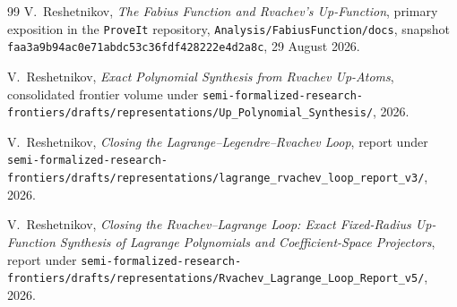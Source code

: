 \documentclass[11pt,oneside]{article}
\numberwithin{equation}{section}
\theoremstyle{definition}
\theoremstyle{remark}
\newcommand{\repo}{\nolinkurl{Analysis/FabiusFunction/docs}}
\begin{document}
\begin{thebibliography}{99}
V.~Reshetnikov,
\newblock \emph{The Fabius Function and Rvachev's Up-Function},
\newblock primary exposition in the \texttt{ProveIt} repository,
\repo, snapshot \texttt{faa3a9b94ac0e71abdc53c36fdf428222e4d2a8c},
29 August 2026.

V.~Reshetnikov,
\newblock \emph{Exact Polynomial Synthesis from Rvachev Up-Atoms},
\newblock consolidated frontier volume under
\nolinkurl{semi-formalized-research-frontiers/drafts/representations/Up_Polynomial_Synthesis/},
2026.

V.~Reshetnikov,
\newblock \emph{Closing the Lagrange--Legendre--Rvachev Loop},
\newblock report under
\nolinkurl{semi-formalized-research-frontiers/drafts/representations/lagrange_rvachev_loop_report_v3/},
2026.

V.~Reshetnikov,
\newblock \emph{Closing the Rvachev--Lagrange Loop: Exact Fixed-Radius
Up-Function Synthesis of Lagrange Polynomials and Coefficient-Space
Projectors},
\newblock report under
\nolinkurl{semi-formalized-research-frontiers/drafts/representations/Rvachev_Lagrange_Loop_Report_v5/},
2026.

\end{thebibliography}
\end{document}
